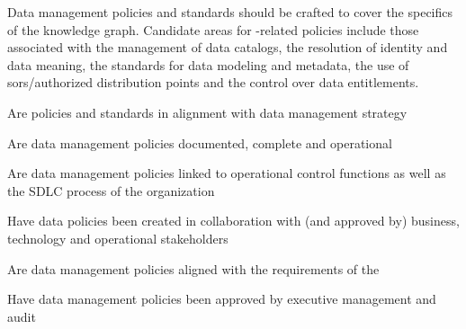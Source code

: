 %
%

\ekgmmContextSection

Data management policies and standards should be crafted to cover the specifics of the knowledge graph.
Candidate areas for -related policies include those associated with the management of data catalogs,
the resolution of identity and data meaning, the standards for data modeling and metadata,
the use of \glspl{sor}/authorized distribution points and the control over data entitlements.

\ekgmmcorequestionssection

\begin{core-questions}

  \item [\thesection.1] Are policies and standards in alignment with data management strategy
  \item [\thesection.2] Are data management policies documented, complete and operational
  \item [\thesection.3] Are data management policies linked to operational control functions as well as the
                        SDLC process of the organization
  \item [\thesection.4] Have data policies been created in collaboration with (and approved by) business, technology
                        and operational stakeholders
  \item [\thesection.5] Are data management policies aligned with the requirements of the 
  \item [\thesection.6] Have data management policies been approved by executive management and audit

\end{core-questions}

